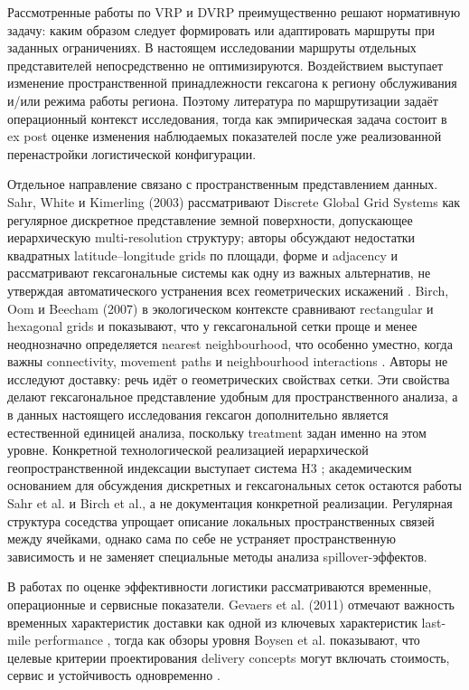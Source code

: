 \documentclass[14pt,a4paper]{extarticle}
\begin{document}
Рассмотренные работы по VRP и DVRP преимущественно решают нормативную задачу: каким образом следует формировать или адаптировать маршруты при заданных ограничениях. В настоящем исследовании маршруты отдельных представителей непосредственно не оптимизируются. Воздействием выступает изменение пространственной принадлежности гексагона к региону обслуживания и/или режима работы региона. Поэтому литература по маршрутизации задаёт операционный контекст исследования, тогда как эмпирическая задача состоит в ex post оценке изменения наблюдаемых показателей после уже реализованной перенастройки логистической конфигурации.

Отдельное направление связано с пространственным представлением данных. Sahr, White и Kimerling (2003) рассматривают Discrete Global Grid Systems как регулярное дискретное представление земной поверхности, допускающее иерархическую multi-resolution структуру; авторы обсуждают недостатки квадратных latitude--longitude grids по площади, форме и adjacency и рассматривают гексагональные системы как одну из важных альтернатив, не утверждая автоматического устранения всех геометрических искажений \cite{sahr2003}. Birch, Oom и Beecham (2007) в экологическом контексте сравнивают rectangular и hexagonal grids и показывают, что у гексагональной сетки проще и менее неоднозначно определяется nearest neighbourhood, что особенно уместно, когда важны connectivity, movement paths и neighbourhood interactions \cite{birch2007}. Авторы не исследуют доставку: речь идёт о геометрических свойствах сетки. Эти свойства делают гексагональное представление удобным для пространственного анализа, а в данных настоящего исследования гексагон дополнительно является естественной единицей анализа, поскольку treatment задан именно на этом уровне. Конкретной технологической реализацией иерархической геопространственной индексации выступает система H3 \cite{uber2018}; академическим основанием для обсуждения дискретных и гексагональных сеток остаются работы Sahr et al. и Birch et al., а не документация конкретной реализации. Регулярная структура соседства упрощает описание локальных пространственных связей между ячейками, однако сама по себе не устраняет пространственную зависимость и не заменяет специальные методы анализа spillover-эффектов.

В работах по оценке эффективности логистики рассматриваются временные, операционные и сервисные показатели. Gevaers et al. (2011) отмечают важность временных характеристик доставки как одной из ключевых характеристик last-mile performance \cite{gevaers2011}, тогда как обзоры уровня Boysen et al. показывают, что целевые критерии проектирования delivery concepts могут включать стоимость, сервис и устойчивость одновременно \cite{boysen2021}.
\end{document}
